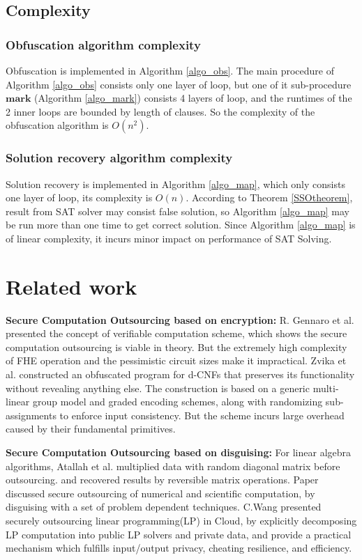 \documentclass[conference]{IEEEtran}
\begin{document}
\subsection{Complexity}
\subsubsection{Obfuscation algorithm complexity}
Obfuscation is implemented in Algorithm \ref{algo_obs}.
The main procedure of Algorithm \ref{algo_obs} consists only one layer of loop,
but one of it sub-procedure $\mathbf{mark}$ (Algorithm \ref{algo_mark}) consists 4 layers of loop, 
and the runtimes of the 2 inner loops are bounded by length of clauses.
So the complexity of the obfuscation algorithm is $O(n^2)$.

\subsubsection{Solution recovery algorithm complexity}
Solution recovery is implemented in  Algorithm \ref{algo_map}, 
which only consists one layer of loop, 
its complexity is $O(n)$.
According to Theorem \ref{SSOtheorem}, result from SAT solver may consist false solution,
so Algorithm \ref{algo_map} may be run more than one time to get correct solution.
Since Algorithm \ref{algo_map} is of linear complexity,
it incurs minor impact on performance of SAT Solving.

\section{Related work}
\textbf{Secure Computation Outsourcing based on encryption:}
R. Gennaro et al.\cite{R.Gennaro} presented the concept of verifiable computation scheme,
which shows the secure computation outsourcing is viable in theory.
But the extremely high complexity of FHE operation and the pessimistic circuit sizes make it impractical.
Zvika et al.\cite{OBfuscationd-CNFs} constructed an obfuscated program for d-CNFs that preserves its functionality without revealing anything else.
The construction is based on a generic multi-linear group model and graded encoding schemes,
along with randomizing sub-assignments to enforce input consistency.
But the scheme incurs large overhead caused by their fundamental primitives.

\textbf{Secure Computation Outsourcing based on disguising:}
For linear algebra algorithms,
Atallah et al. \cite{t19} multiplied data with random diagonal matrix before outsourcing.
and recovered results by reversible matrix operations.
Paper \cite{t20} discussed secure outsourcing of numerical and scientific computation,
by disguising with a set of problem dependent techniques.
C.Wang\cite{c.WANG} presented securely outsourcing linear programming(LP) in Cloud,
by explicitly decomposing LP computation into public LP solvers and private data,
and provide a practical mechanism which fulfills input/output privacy,
cheating resilience, and efficiency.
\end{document}
